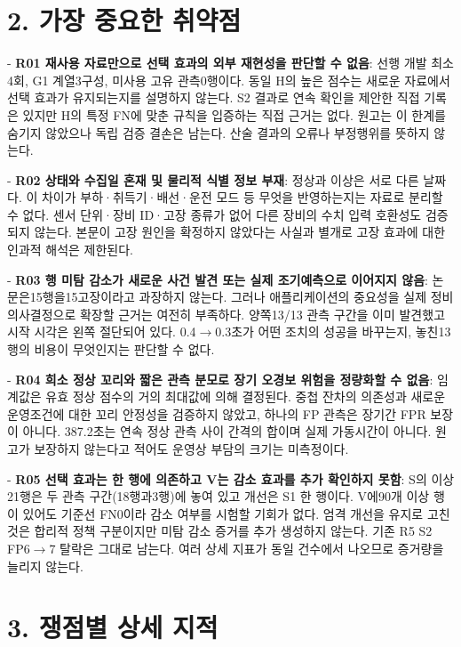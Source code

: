 \documentclass[11pt,a4paper]{article}
\begin{document}
\section*{2. 가장 중요한 취약점}
- \textbf{R01 재사용 자료만으로 선택 효과의 외부 재현성을 판단할 수 없음}: 선행 개발 최소4회, G1 계열3구성, 미사용 고유 관측0행이다. 동일 H의 높은 점수는 새로운 자료에서 선택 효과가 유지되는지를 설명하지 않는다. S2 결과로 연속 확인을 제안한 직접 기록은 있지만 H의 특정 FN에 맞춘 규칙을 입증하는 직접 근거는 없다. 원고는 이 한계를 숨기지 않았으나 독립 검증 결손은 남는다. 산술 결과의 오류나 부정행위를 뜻하지 않는다.\par
- \textbf{R02 상태와 수집일 혼재 및 물리적 식별 정보 부재}: 정상과 이상은 서로 다른 날짜다. 이 차이가 부하·취득기·배선·운전 모드 등 무엇을 반영하는지는 자료로 분리할 수 없다. 센서 단위·장비 ID·고장 종류가 없어 다른 장비의 수치 입력 호환성도 검증되지 않는다. 본문이 고장 원인을 확정하지 않았다는 사실과 별개로 고장 효과에 대한 인과적 해석은 제한된다.\par
- \textbf{R03 행 미탐 감소가 새로운 사건 발견 또는 실제 조기예측으로 이어지지 않음}: 논문은15행을15고장이라고 과장하지 않는다. 그러나 애플리케이션의 중요성을 실제 정비 의사결정으로 확장할 근거는 여전히 부족하다. 양쪽13/13 관측 구간을 이미 발견했고 시작 시각은 왼쪽 절단되어 있다. 0.4$\to$0.3초가 어떤 조치의 성공을 바꾸는지, 놓친13행의 비용이 무엇인지는 판단할 수 없다.\par
- \textbf{R04 희소 정상 꼬리와 짧은 관측 분모로 장기 오경보 위험을 정량화할 수 없음}: 임계값은 유효 정상 점수의 거의 최대값에 의해 결정된다. 중첩 잔차의 의존성과 새로운 운영조건에 대한 꼬리 안정성을 검증하지 않았고, 하나의 FP 관측은 장기간 FPR 보장이 아니다. 387.2초는 연속 정상 관측 사이 간격의 합이며 실제 가동시간이 아니다. 원고가 보장하지 않는다고 적어도 운영상 부담의 크기는 미측정이다.\par
- \textbf{R05 선택 효과는 한 행에 의존하고 V는 감소 효과를 추가 확인하지 못함}: S의 이상21행은 두 관측 구간(18행과3행)에 놓여 있고 개선은 S1 한 행이다. V에90개 이상 행이 있어도 기준선 FN0이라 감소 여부를 시험할 기회가 없다. 엄격 개선을 유지로 고친 것은 합리적 정책 구분이지만 미탐 감소 증거를 추가 생성하지 않는다. 기존 R5 S2 FP6$\to$7 탈락은 그대로 남는다. 여러 상세 지표가 동일 건수에서 나오므로 증거량을 늘리지 않는다.\par
\section*{3. 쟁점별 상세 지적}
\end{document}
